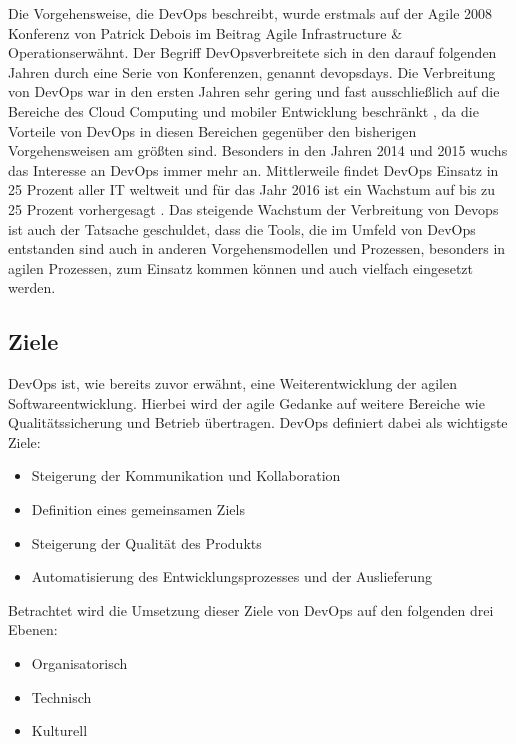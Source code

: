 Die Vorgehensweise, die DevOps beschreibt, wurde erstmals auf der Agile 2008 Konferenz von Patrick Debois im Beitrag \glqq Agile Infrastructure \& Operations\grqq erwähnt.\parencite[Vgl.][]{Debois:2008} Der Begriff \glqq DevOps\grqq verbreitete sich in den darauf folgenden Jahren durch eine Serie von Konferenzen, genannt \glqq devopsdays\grqq. Die Verbreitung von DevOps war in den ersten Jahren sehr gering und fast ausschließlich auf die Bereiche des Cloud Computing und mobiler Entwicklung beschränkt \parencite[Vgl.][]{Gartner:2015}, da die Vorteile von DevOps in diesen Bereichen gegenüber den bisherigen Vorgehensweisen am größten sind. Besonders in den Jahren 2014 und 2015 wuchs das Interesse an DevOps immer mehr an. \parencite[Vgl.][]{DevOpsSODR:2015} Mittlerweile findet DevOps Einsatz in 25 Prozent aller IT weltweit und für das Jahr 2016 ist ein Wachstum auf bis zu 25 Prozent vorhergesagt \parencite[Vgl.][]{Gartner:2015}. Das steigende Wachstum der Verbreitung von Devops ist auch der Tatsache geschuldet, dass die Tools, die im Umfeld von DevOps entstanden sind auch in anderen Vorgehensmodellen und Prozessen, besonders in agilen Prozessen, zum Einsatz kommen können und auch vielfach eingesetzt werden.

\subsection{Ziele}
DevOps ist, wie bereits zuvor erwähnt, eine Weiterentwicklung der agilen Softwareentwicklung. Hierbei wird der agile Gedanke auf weitere Bereiche wie Qualitätssicherung und Betrieb übertragen. DevOps definiert dabei als wichtigste Ziele:

\begin{itemize}
\item Steigerung der Kommunikation und Kollaboration
\item Definition eines gemeinsamen Ziels
\item Steigerung der Qualität des Produkts
\item Automatisierung des Entwicklungsprozesses und der Auslieferung
\end{itemize}

Betrachtet wird die Umsetzung dieser Ziele von DevOps auf den folgenden drei Ebenen: 

\begin{itemize}
\item Organisatorisch
\item Technisch
\item Kulturell
\end{itemize}

